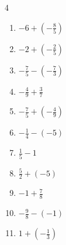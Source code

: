 \begin{multicols}{4}
\begin{enumerate}

  \item $\displaystyle -6 + \left(-\frac{8}{5}\right)$


  \item $\displaystyle -2 + \left(-\frac{2}{5}\right)$


\columnbreak %

\resetques

  \item $\displaystyle -\frac{7}{5} - \left(-\frac{7}{3}\right)$


  \item $\displaystyle -\frac{4}{9} + \frac{3}{7}$


  \item $\displaystyle -\frac{7}{5} + \left(-\frac{4}{9}\right)$


  \item $\displaystyle -\frac{1}{4} - \left(-5\right)$


  \item $\displaystyle \frac{1}{5} - 1$


  \item $\displaystyle \frac{5}{2} + \left(-5\right)$


  \item $\displaystyle -1 + \frac{7}{8}$


  \item $\displaystyle -\frac{9}{8} - \left(-1\right)$


  \item $\displaystyle 1 + \left(-\frac{1}{3}\right)$



\end{enumerate}
\end{multicols}
